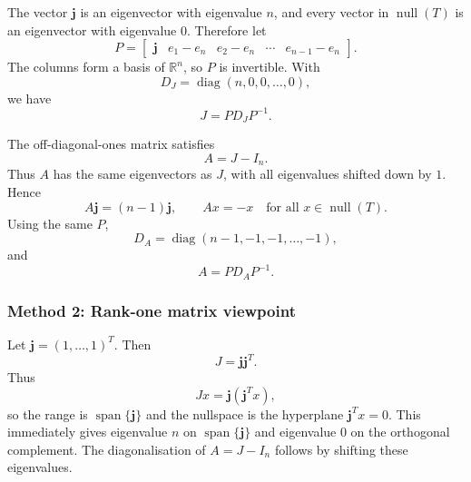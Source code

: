 \documentclass[12pt]{article}
\newcommand{\R}{\mathbb{R}}
\newcommand{\Null}{\operatorname{null}}
\newcommand{\Span}{\operatorname{span}}
\newcommand{\diag}{\operatorname{diag}}
\begin{document}
The vector $\mathbf j$ is an eigenvector with eigenvalue $n$, and every vector in $\Null(T)$ is an eigenvector with eigenvalue $0$. Therefore let
\[
P=\begin{bmatrix}\mathbf j& e_1-e_n& e_2-e_n&\cdots& e_{n-1}-e_n\end{bmatrix}.
\]
The columns form a basis of $\R^n$, so $P$ is invertible. With
\[
D_J=\diag(n,0,0,\ldots,0),
\]
we have
\[
\boxed{J=PD_JP^{-1}.}
\]

The off-diagonal-ones matrix satisfies
\[
A=J-I_n.
\]
Thus $A$ has the same eigenvectors as $J$, with all eigenvalues shifted down by $1$. Hence
\[
A\mathbf j=(n-1)\mathbf j,
\qquad
Ax=-x\quad\text{for all }x\in\Null(T).
\]
Using the same $P$,
\[
D_A=\diag(n-1,-1,-1,\ldots,-1),
\]
and
\[
\boxed{A=PD_AP^{-1}.}
\]

\subsubsection{Method 2: Rank-one matrix viewpoint}
Let $\mathbf j=(1,\ldots,1)^T$. Then
\[
J=\mathbf j\mathbf j^T.
\]
Thus
\[
Jx=\mathbf j(\mathbf j^Tx),
\]
so the range is $\Span\{\mathbf j\}$ and the nullspace is the hyperplane $\mathbf j^Tx=0$. This immediately gives eigenvalue $n$ on $\Span\{\mathbf j\}$ and eigenvalue $0$ on the orthogonal complement. The diagonalisation of $A=J-I_n$ follows by shifting these eigenvalues.
\end{document}
